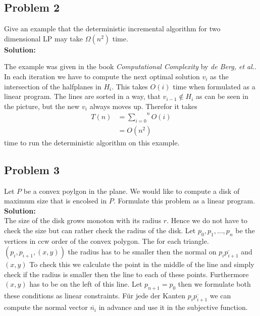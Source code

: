 \documentclass[11pt,a4paper,ngerman]{article}
\begin{document}
\subsection*{Problem 2}

Give an example that the deterministic incremental algorithm for two dimensional LP may take $\Omega(n^2)$ time.\\

\textbf{Solution:}\\

\vspace{15cm}

The example was given in the book \emph{Computational Complexity} by \emph{de Berg, et al.}. In each iteration we have to compute the next optimal solution $v_i$ as the intersection of the halfplanes in $H_i$. This takes $O(i)$ time when formulated as a linear program.
The lines are sorted in a way, that $v_{i-1} \not\in H_i$ as can be seen
in the picture, but the new $v_i$ always moves up. Therefor it takes
\begin{equation}\begin{split}
    T(n) &= \overset{n}{\underset{i=0}{\sum}} O(i)\\
        &= O(n^2)
\end{split}\end{equation}
time to run the deterministic algorithm on this example.

\subsection*{Problem 3}
Let $P$ be a convex poylgon in the plane. We would like to compute a disk
of maximum size that is encolsed in $P$. Formulate this problem as a linear
program.\\

\textbf{Solution:}\\

The size of the disk grows monoton with its radius $r$. Hence we do not have
to check the size but can rather check the radius of the disk.
Let $p_0, p_1, ..., p_n$ be the vertices in ccw order of the convex polygon.
The for each triangle. $(p_i, p_{i+1}, (x,y))$ the radius has to be smaller
then the normal on $\overline{p_ip_{i+1}}$ and $(x,y)$ To check this
we calculate the point in the middle of the line and simply check
if the radius is smaller then the line to each of these points. Furthermore
$(x,y)$ has to be on the left of this line. Let $p_{n+1}=p_0$ then we
formulate both these conditions as linear constraints.
Für jede der Kanten $\overline{p_ip_{i+1}}$ we can compute the
normal vector $\overline{n_i}$ in advance and use it in the subjective function.
\end{document}
